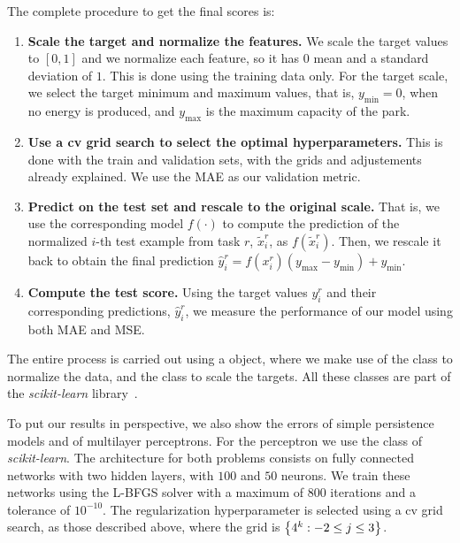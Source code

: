 %
The complete procedure to get the final scores is:
\begin{enumerate}
    \item \textbf{Scale the target and normalize the features.} We scale the target values to $[0, 1]$ and we normalize each feature, so it has $0$ mean and a standard deviation of $1$. This is done using the training data only. 
    For the target scale, we select the target minimum and maximum values, that is, $y_\text{min} = 0$, when no energy is produced, and $y_\text{max}$ is the maximum capacity of the park.    
    \item \textbf{Use a \acrshort{cv} grid search to select the optimal hyperparameters.} This is done with the train and validation sets, with the grids and adjustements already explained. We use the MAE as our validation metric.
    \item \textbf{Predict on the test set and rescale to the original scale.} That is, we use the corresponding model $f(\cdot)$ to compute the prediction of the normalized $i$-th test example from task $r$, $\tilde{x}_i^r$, as $f(\tilde{x}_i^r)$. Then, we rescale it back to obtain the final prediction $\hat{y}_i^r = f(x_i^r)  (y_\text{max} - y_\text{min} ) + y_\text{min}$.
    \item \textbf{Compute the test score.} Using the target values $y_i^r$ and their corresponding predictions, $\hat{y}_i^r$, we measure the performance of our model using both MAE and MSE.
\end{enumerate}
The entire process is carried out using a  object, where we make use of the class  to normalize the data, and the  class to scale the targets. All these classes are part of the \emph{scikit-learn} library~\citep{scikit-learn}.

%
To put our results in perspective, we also show the errors of simple persistence models and of multilayer perceptrons. For the perceptron we use the  class of \emph{scikit-learn}. The architecture for both problems consists on fully connected networks with two hidden layers, with $100$ and $50$ neurons. We train these networks using the L-BFGS solver with a maximum of $800$ iterations and a tolerance of $10^{-10}$. The regularization hyperparameter is selected using a \acrshort{cv} grid search, as those described above, where the grid is $\left\{4^k: -2 \leq j \leq 3\right\}$.






